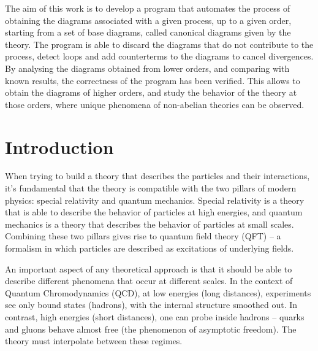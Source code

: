\documentclass[11pt,a4paper,twoside,pdf]{article}
\numberwithin{equation}{section}
\begin{document}
\begin{center}
\begin{minipage}{0.8\linewidth}
The aim of this work is to develop a program that automates the process of
obtaining the diagrams associated with a given process, up to a given order,
starting from a set of base diagrams, called canonical diagrams given by the
theory. The program is able to discard the diagrams that do not contribute to the
process, detect loops and add counterterms to the diagrams to cancel divergences. \\

By analysing the diagrams obtained from lower orders, and comparing with known
results, the correctness of the program has been verified. This allows to obtain
the diagrams of higher orders, and study the behavior of the theory at those
orders, where unique phenomena of non-abelian theories can be observed.

\end{minipage}

\newpage

\end{center}


\pagestyle{empty}       %
\tableofcontents
\setcounter{page}{0}       %


\pagestyle{fancy}
\fancyhead[RO,LE]{\leftmark}
\fancyhead[LO,RE]{\thepage}
\fancyfoot{}

\newpage

\section{Introduction}

When trying to build a theory that describes the particles and their interactions, 
it's fundamental that the theory is compatible with the two pillars of modern physics:
special relativity and quantum mechanics. Special relativity is a theory 
that is able to describe the behavior of particles at high energies, and quantum 
mechanics is a theory that describes the behavior of particles at small scales.
Combining these two pillars gives rise to quantum field theory (QFT) – a formalism 
in which particles are described as excitations of underlying fields.

An important aspect of any theoretical approach is that it should be able to describe  
different phenomena that occur at different scales. In the context of Quantum 
Chromodynamics (QCD), at low energies (long distances), experiments see only bound 
states (hadrons), with the internal structure smoothed out. In contrast, high energies 
(short distances), one can probe inside hadrons – quarks and gluons behave almost free 
(the phenomenon of asymptotic freedom). The theory must interpolate between these regimes.
\end{document}
